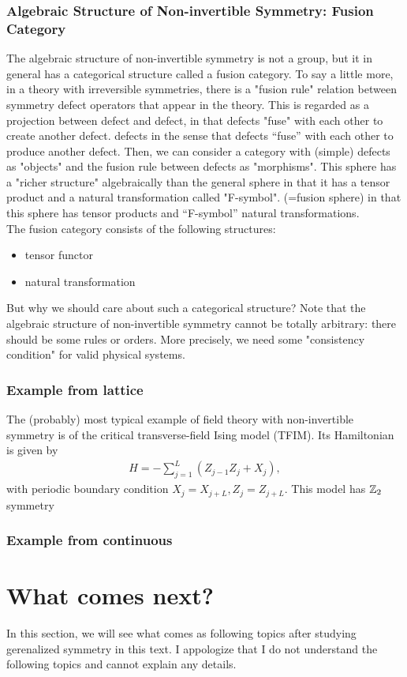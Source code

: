 \documentclass{ltjsarticle}
\theoremstyle{mystyle} %
\numberwithin{equation}{section}
\begin{document}
\subsubsection{Algebraic Structure of Non-invertible Symmetry: Fusion Category}
The algebraic structure of non-invertible symmetry is not a group, but it in general has a categorical structure called a fusion category. 
To say a little more, in a theory with irreversible symmetries, there is a "fusion rule" relation between symmetry defect operators that appear in the theory. 
This is regarded as a projection between defect and defect, in that defects "fuse" with each other to create another defect. defects in the sense that defects “fuse” with each other to produce another defect. 
Then, we can consider a category with (simple) defects as "objects" and the fusion rule between defects as "morphisms". 
This sphere has a "richer structure" algebraically than the general sphere 
in that it has a tensor product and a natural transformation called "F-symbol". (=fusion sphere) in that this sphere has tensor products and “F-symbol” natural transformations. 
\\
 The fusion category consists of the following structures: 
\begin{itemize}
    \item tensor functor
    \item natural transformation 
\end{itemize}
 But why we should care about such a categorical structure?
  Note that the algebraic structure of non-invertible symmetry cannot be totally arbitrary: 
  there should be some rules or orders. 
  More precisely, we need some "consistency condition" for valid physical systems. 
\subsubsection{Example from lattice}
The (probably) most typical example of field theory with non-invertible symmetry is 
of the critical transverse-field Ising model (TFIM). Its Hamiltonian is given by
\begin{align}
    H = -\sum_{j=1}^{L}(Z_{j-1}Z_j + X_j), 
\end{align}
with periodic boundary condition $X_j = X_{j+L}, Z_j=Z_{j+L}$. 
This model has $\mathbb{Z}_2$ symmetry
\subsubsection{Example from continuous}
\section{What comes next?}
In this section, we will see what comes as following topics after studying gerenalized symmetry in this text. 
I appologize that I do not understand the following topics and cannot explain any details. 
\end{document}
